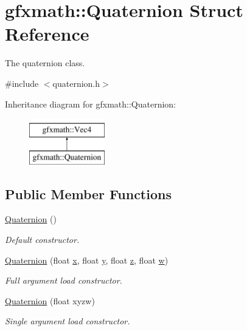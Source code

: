 \hypertarget{structgfxmath_1_1_quaternion}{}\section{gfxmath\+:\+:Quaternion Struct Reference}
\label{structgfxmath_1_1_quaternion}


The quaternion class.  




{\ttfamily \#include $<$quaternion.\+h$>$}

Inheritance diagram for gfxmath\+:\+:Quaternion\+:\begin{figure}[H]
\begin{center}
\leavevmode
\includegraphics[height=2.000000cm]{structgfxmath_1_1_quaternion}
\end{center}
\end{figure}
\subsection*{Public Member Functions}
\begin{DoxyCompactItemize}
\item 
\hyperlink{structgfxmath_1_1_quaternion_a46f549f23e8bd1032697e3febcff7fe5}{Quaternion} ()
\begin{DoxyCompactList}\small\item\em Default constructor. \end{DoxyCompactList}\item 
\hyperlink{structgfxmath_1_1_quaternion_a8b19546f4e4a48a3784b80b0fd8208d9}{Quaternion} (float \hyperlink{structgfxmath_1_1_vec4_a273598aff75406f0e7a47121b8b06037}{x}, float \hyperlink{structgfxmath_1_1_vec4_a95e0ca27d66d7e0223606c20d326b595}{y}, float \hyperlink{structgfxmath_1_1_vec4_acd626b757468a5ea39f98812a36c4419}{z}, float \hyperlink{structgfxmath_1_1_vec4_adf2769a47b464dfee8d04e191f21701e}{w})
\begin{DoxyCompactList}\small\item\em Full argument load constructor. \end{DoxyCompactList}\item 
\hyperlink{structgfxmath_1_1_quaternion_ac8a094f33b02273387afa1beeabb9034}{Quaternion} (float xyzw)
\begin{DoxyCompactList}\small\item\em Single argument load constructor. \end{DoxyCompactList}\end{DoxyCompactItemize}
